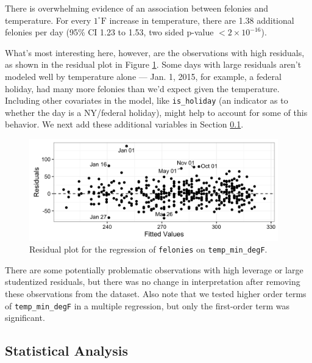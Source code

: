 \documentclass[11pt,notitlepage]{article}
\newcommand{\degf}{^\circ\text{F}}
\begin{document}

There is overwhelming evidence of an association between felonies and temperature. For every $1 \degf$ increase in temperature, there are 1.38 additional felonies per day (95\% CI 1.23 to 1.53, two sided p-value $<2\times10^{-16}$).

What's most interesting here, however, are the observations with high residuals, as shown in the residual plot in Figure \ref{fig:lm1Residuals}. Some days with large residuals aren't modeled well by temperature alone --- Jan. 1, 2015, for example, a federal holiday, had many more felonies than we'd expect given the temperature. Including other covariates in the model, like \texttt{is_holiday} (an indicator as to whether the day is a NY/federal holiday), might help to account for some of this behavior. We next add these additional variables in Section \ref{sec:modelFeloniesMultipleRegression}.

\begin{figure}[!h]
  \vspace*{-3mm}
	\centering
	\captionsetup{width=0.9\textwidth}
	\includegraphics[width=4.25in]{figures/lm1Residuals.png}
	\vspace*{-3mm}
	\caption{Residual plot for the regression of \texttt{felonies} on \texttt{temp_min_degF}.}
	\label{fig:lm1Residuals}
	\vspace*{-3mm}
\end{figure}


There are some potentially problematic observations with high leverage or large studentized residuals, but there was no change in interpretation after removing these observations from the dataset. Also note that we tested higher order terms of \texttt{temp_min_degF} in a multiple regression, but only the first-order term was significant.


\subsection{Statistical Analysis}
\label{sec:modelFeloniesMultipleRegression}
\end{document}
